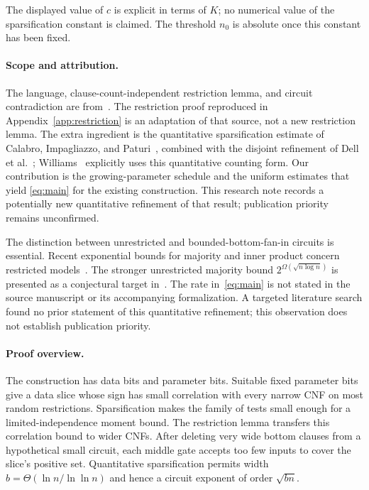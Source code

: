 \documentclass[11pt,letterpaper]{article}
\theoremstyle{definition}
\numberwithin{equation}{section}
\begin{document}
The displayed value of $c$ is explicit in terms of $K$; no numerical
value of the sparsification constant is claimed. The threshold $n_0$ is
absolute once this constant has been fixed.

\paragraph{Scope and attribution.}
The language, clause-count-independent restriction lemma, and circuit
contradiction are from~\cite{OAI26}. The restriction proof reproduced in
Appendix~\ref{app:restriction} is an adaptation of that source, not a new
restriction lemma. The extra ingredient is the quantitative sparsification
estimate of Calabro, Impagliazzo, and Paturi~\cite{CIP}, combined with the
disjoint refinement of Dell et al.~\cite{DHMTW}; Williams~\cite{Williams}
explicitly uses this quantitative counting form. Our contribution is the
growing-parameter schedule and the uniform estimates that yield
\eqref{eq:main} for the existing construction. This research note records a
potentially new quantitative refinement of that result; publication priority
remains unconfirmed.

The distinction between unrestricted and bounded-bottom-fan-in circuits
is essential. Recent exponential bounds for majority and inner product
concern restricted models~\cite{GKKPRST,GKPRT26IP}. The stronger unrestricted
majority bound $2^{\Omega(\sqrt{n\log n})}$ is presented as a conjectural
target in~\cite{GKKPRST}. The rate in~\eqref{eq:main} is not stated in
the source manuscript or its accompanying formalization. A targeted
literature search found no prior statement of this quantitative refinement;
this observation does not establish publication priority.

\paragraph{Proof overview.}
The construction has data bits and parameter bits. Suitable fixed parameter
bits give a data slice whose sign has small correlation with every narrow
CNF on most random restrictions. Sparsification makes the family of tests
small enough for a limited-independence moment bound. The restriction lemma
transfers this correlation bound to wider CNFs. After deleting very wide
bottom clauses from a hypothetical small circuit, each middle gate accepts
too few inputs to cover the slice's positive set. Quantitative
sparsification permits width $b=\Theta(\ln n/\ln\ln n)$ and hence a circuit
exponent of order $\sqrt{bn}$.
\end{document}
